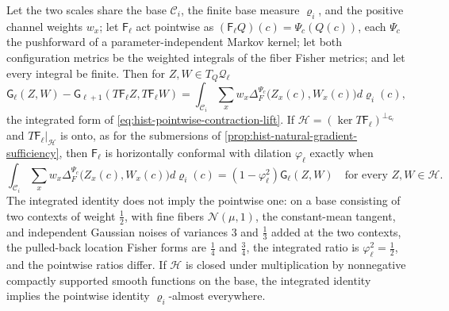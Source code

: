 Let the two scales share the base \(\mathcal C_i\), the finite base measure
\(\varrho_i\), and the positive channel weights \(w_x\); let
\(\mathsf F_\ell\) act pointwise as \((\mathsf F_\ell Q)(c)=\Psi_c(Q(c))\), each
\(\Psi_c\) the pushforward of a parameter-independent Markov kernel; let both
configuration metrics be the weighted integrals of the fiber Fisher metrics; and
let every integral be finite. Then for \(Z,W\in T_Q\mathcal Q_\ell\)
\[
\mathsf G_\ell(Z,W)-\mathsf G_{\ell+1}(T\mathsf F_\ell Z,T\mathsf F_\ell W)
=\int_{\mathcal C_i}\sum_xw_x\Delta_F^{\Psi_c}\bigl(Z_x(c),W_x(c)\bigr)d\varrho_i(c),
\]
the integrated form of \eqref{eq:hist-pointwise-contraction-lift}. If
\(\mathcal H=(\ker T\mathsf F_\ell)^{\perp_{\mathsf G_\ell}}\) and
\(T\mathsf F_\ell|_{\mathcal H}\) is onto, as for the submersions of
\cref{prop:hist-natural-gradient-sufficiency}, then \(\mathsf F_\ell\) is
horizontally conformal with dilation \(\varphi_\ell\) exactly when
\begin{equation}
\int_{\mathcal C_i}\sum_xw_x
\Delta_F^{\Psi_c}\bigl(Z_x(c),W_x(c)\bigr)d\varrho_i(c)
=(1-\varphi_\ell^2)\mathsf G_\ell(Z,W)
\quad\text{for every }Z,W\in\mathcal H.
\label{eq:hist-integrated-conformality-criterion}
\end{equation}
The integrated identity does not imply the pointwise one: on a base consisting
of two contexts of weight \(\tfrac12\), with fine fibers \(\mathcal N(\mu,1)\),
the constant-mean tangent, and independent Gaussian noises of variances \(3\) and
\(\tfrac13\) added at the two contexts, the pulled-back location Fisher forms are
\(\tfrac14\) and \(\tfrac34\), the integrated ratio is \(\varphi_\ell^2=\tfrac12\),
and the pointwise ratios differ. If \(\mathcal H\) is closed under multiplication
by nonnegative compactly supported smooth functions on the base, the integrated
identity implies the pointwise identity \(\varrho_i\)-almost everywhere.

